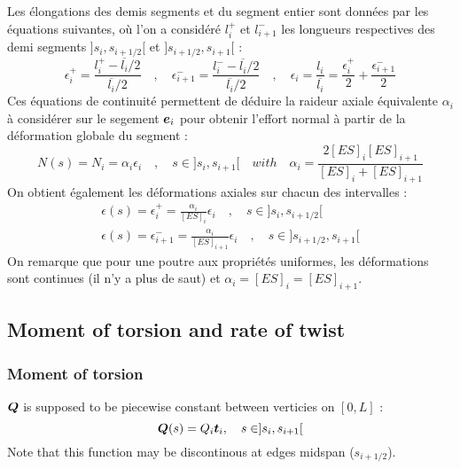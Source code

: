 Les élongations des demis segments et du segment entier sont données par les équations suivantes, où l'on a considéré $l_i^+$ et $l_{i+1}^-$ les longueurs respectives des demi segments $]s_i,s_{i+1/2}[$ et $]s_{i+1/2},s_{i+1}[$ :
\begin{equation}
	\epsilon_{i}^{+} = \frac{l_i^+ - \overbar{l_i}/2}{\overbar{l_i}/2} \quad , \quad
	\epsilon_{i+1}^{-} = \frac{l_i^- - \overbar{l_i}/2}{\overbar{l_i}/2} \quad , \quad
	\epsilon_i = \frac{l_i}{\overbar{l_i}} = \frac{\epsilon_{i}^{+}}{2} + \frac{\epsilon_{i+1}^{-}}{2}
\end{equation}
Ces équations de continuité permettent de déduire la raideur axiale équivalente $\alpha_i$ à considérer sur le segement $\boldsymbol{e}_i$ pour obtenir l'effort normal à partir de la déformation globale du segment :
 \begin{equation}
	N(s) = N_i = \alpha_i\epsilon_i \quad , \quad s \in ]s_i,s_{i+1}[
	\quad with \quad \alpha_i = \frac{2 [ES]_i [ES]_{i+1}}{[ES]_i + [ES]_{i+1}}
\end{equation}
On obtient également les déformations axiales sur chacun des intervalles :
\begin{subequations}
	\begin{gather}
		\epsilon(s) = \epsilon_{i}^{+} = \frac{\alpha_i}{[ES]_i}\epsilon_i \quad , \quad s \in ]s_i,s_{i+1/2}[ \\
		\epsilon(s) = \epsilon_{i+1}^{-} = \frac{\alpha_i}{[ES]_{i+1}}\epsilon_i \quad , \quad s \in ]s_{i+1/2},s_{i+1}[
	\end{gather}
\end{subequations}
On remarque que pour une poutre aux propriétés uniformes, les déformations sont continues (il n'y a plus de saut) et $\alpha_i = [ES]_i = [ES]_{i+1}$.

\subsection{Moment of torsion and rate of twist}

\subsubsection{Moment of torsion}
$\boldsymbol{Q}$ is supposed to be piecewise constant between verticies on $[0,L]$ :
\begin{equation}
	\boldsymbol{Q}(s) = Q_i \boldsymbol{t}_i , \quad s \in ]s_i,s_{i+1}[
\end{equation}
Note that this function may be discontinous at edges midspan ($s_{i+1/2}$).

